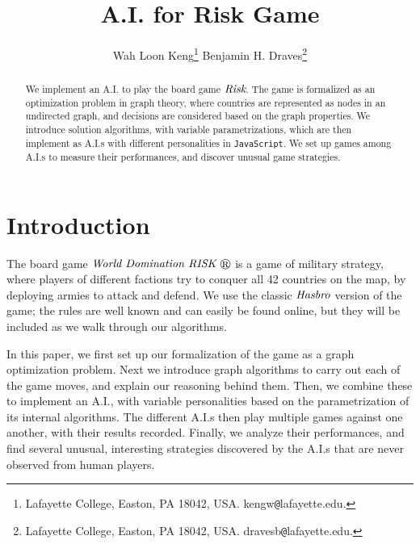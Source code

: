 \documentclass[12pt]{article}  %
\begin{document}
\title{A.I. for Risk Game}

\author{
{Wah Loon Keng}\thanks{
Lafayette College,
Easton, PA 18042, USA.
kengw{\tt @}lafayette.edu.}
\qquad
{Benjamin H. Draves}\thanks{
Lafayette College,
Easton, PA 18042, USA.
dravesb{\tt @}lafayette.edu.}
}
\maketitle

\begin{abstract}
We implement an A.I. to play the board game $\emph{Risk}$. The game is formalized as an optimization problem in graph theory, where countries are represented as nodes in an undirected graph, and decisions are considered based on the graph properties. We introduce solution algorithms, with variable parametrizations, which are then implement as A.I.s with different personalities in {\tt JavaScript}. We set up games among A.I.s to measure their performances, and discover unusual game strategies.
\end{abstract}










\section{Introduction} \label{intro}

The board game $\emph{World Domination RISK \circledR}$ is a game of military strategy, where players of different factions try to conquer all 42 countries on the map, by deploying armies to attack and defend. We use the classic $\emph{Hasbro}$ version of the game; the rules are well known and can easily be found online, but they will be included as we walk through our algorithms.

In this paper, we first set up our formalization of the game as a graph optimization problem. Next we introduce graph algorithms to carry out each of the game moves, and explain our reasoning behind them. Then, we combine these to implement an A.I., with variable personalities based on the parametrization of its internal algorithms. The different A.I.s then play multiple games against one another, with their results recorded. Finally, we analyze their performances, and find several unusual, interesting strategies discovered by the A.I.s that are never observed from human players.
\end{document}
